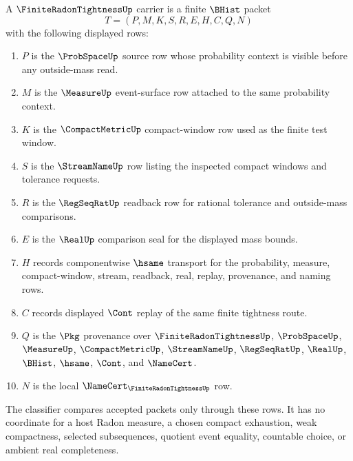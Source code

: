 \begin{definition}
\label{def:finite-radon-tightness-carrier}
A $\FiniteRadonTightnessUp$ carrier is a finite $\BHist$ packet
$$
T=(P,M,K,S,R,E,H,C,Q,N)
$$
with the following displayed rows:
\begin{enumerate}
\item $P$ is the $\ProbSpaceUp$ source row whose probability context is visible before any outside-mass read.
\item $M$ is the $\MeasureUp$ event-surface row attached to the same probability context.
\item $K$ is the $\CompactMetricUp$ compact-window row used as the finite test window.
\item $S$ is the $\StreamNameUp$ row listing the inspected compact windows and tolerance requests.
\item $R$ is the $\RegSeqRatUp$ readback row for rational tolerance and outside-mass comparisons.
\item $E$ is the $\RealUp$ comparison seal for the displayed mass bounds.
\item $H$ records componentwise $\hsame$ transport for the probability, measure, compact-window, stream, readback, real, replay, provenance, and naming rows.
\item $C$ records displayed $\Cont$ replay of the same finite tightness route.
\item $Q$ is the $\Pkg$ provenance over $\FiniteRadonTightnessUp$, $\ProbSpaceUp$, $\MeasureUp$, $\CompactMetricUp$, $\StreamNameUp$, $\RegSeqRatUp$, $\RealUp$, $\BHist$, $\hsame$, $\Cont$, and $\NameCert$.
\item $N$ is the local $\NameCert_{\FiniteRadonTightnessUp}$ row.
\end{enumerate}
The classifier compares accepted packets only through these rows. It has no coordinate for a host Radon measure, a chosen compact exhaustion, weak compactness, selected subsequences, quotient event equality, countable choice, or ambient real completeness.
\end{definition}

